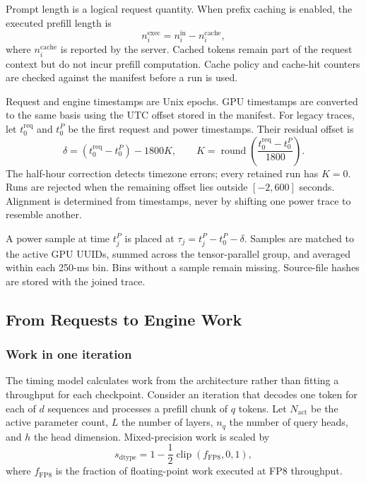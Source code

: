 Prompt length is a logical request quantity.  When prefix caching is enabled,
the executed prefill length is
\begin{equation}
  n_i^{\mathrm{exec}} = n_i^{\mathrm{in}}-n_i^{\mathrm{cache}},
\end{equation}
where $n_i^{\mathrm{cache}}$ is reported by the server.  Cached tokens remain
part of the request context but do not incur prefill computation.  Cache policy
and cache-hit counters are checked against the manifest before a run is used.

Request and engine timestamps are Unix epochs.  GPU timestamps are converted
to the same basis using the UTC offset stored in the manifest.  For legacy
traces, let $t_0^{\mathrm{req}}$ and $t_0^P$ be the first request and power
timestamps.  Their residual offset is
\begin{equation}
  \delta=(t_0^{\mathrm{req}}-t_0^P)-1800K,
  \qquad
  K=\operatorname{round}\!\left(
  \frac{t_0^{\mathrm{req}}-t_0^P}{1800}\right).
  \label{eq:clock-alignment}
\end{equation}
The half-hour correction detects timezone errors; every retained run has
$K=0$.  Runs are rejected when the remaining offset lies outside
$[-2,600]$ seconds.  Alignment is determined from timestamps, never by shifting
one power trace to resemble another.

A power sample at time $t_j^P$ is placed at
$\tau_j=t_j^P-t_0^P-\delta$.  Samples are matched to the active GPU UUIDs,
summed across the tensor-parallel group, and averaged within each 250-ms bin.
Bins without a sample remain missing.  Source-file hashes are stored with the
joined trace.

\subsection{From Requests to Engine Work}
\label{sec:timing-model}

\subsubsection{Work in one iteration}

The timing model calculates work from the architecture rather than fitting a
throughput for each checkpoint.  Consider an iteration that decodes one token
for each of $d$ sequences and processes a prefill chunk of $q$ tokens.  Let
$N_{\mathrm{act}}$ be the active parameter count, $L$ the number of layers,
$n_q$ the number of query heads, and $h$ the head dimension.  Mixed-precision
work is scaled by
\begin{equation}
  s_{\mathrm{dtype}}=1-\frac{1}{2}
  \operatorname{clip}(f_{\mathrm{FP8}},0,1),
  \label{eq:dtype-scale}
\end{equation}
where $f_{\mathrm{FP8}}$ is the fraction of floating-point work executed at
FP8 throughput.


